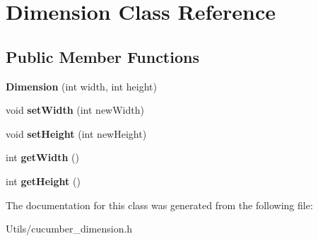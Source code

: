 \hypertarget{classDimension}{}\section{Dimension Class Reference}
\label{classDimension}
\subsection*{Public Member Functions}
\begin{DoxyCompactItemize}
\item 
\hypertarget{classDimension_a48170957fc400065b9d35e83f59f8d6c}{}\label{classDimension_a48170957fc400065b9d35e83f59f8d6c} 
{\bfseries Dimension} (int width, int height)
\item 
\hypertarget{classDimension_a703884548d8cb46152781d0ab92ec676}{}\label{classDimension_a703884548d8cb46152781d0ab92ec676} 
void {\bfseries set\+Width} (int new\+Width)
\item 
\hypertarget{classDimension_ac828614769eccdf7c852e3f39de0f6e9}{}\label{classDimension_ac828614769eccdf7c852e3f39de0f6e9} 
void {\bfseries set\+Height} (int new\+Height)
\item 
\hypertarget{classDimension_a6944428b7369ff36b3ca0f996ac3fec6}{}\label{classDimension_a6944428b7369ff36b3ca0f996ac3fec6} 
int {\bfseries get\+Width} ()
\item 
\hypertarget{classDimension_a5f665696bf771c7aa0d3f861ab77d7a2}{}\label{classDimension_a5f665696bf771c7aa0d3f861ab77d7a2} 
int {\bfseries get\+Height} ()
\end{DoxyCompactItemize}


The documentation for this class was generated from the following file\+:\begin{DoxyCompactItemize}
\item 
Utils/cucumber\+\_\+dimension.\+h\end{DoxyCompactItemize}
